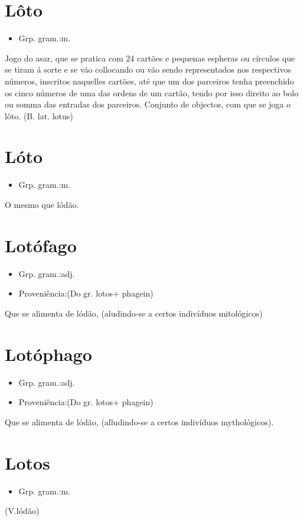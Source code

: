 \section{Lôto}
\begin{itemize}
\item {Grp. gram.:m.}
\end{itemize}
Jogo do asar, que se pratica com 24 cartões e pequenas espheras ou círculos que se tiram á sorte e se vão collocando ou vão sendo representados nos respectivos números, inscritos naquelles cartões, até que um dos parceiros tenha preenchido os cinco números de uma das ordens de um cartão, tendo por isso direito ao bolo ou somma das entradas dos parceiros.
Conjunto de objectos, com que se joga o lôto.
(B. lat. \textunderscore lotus\textunderscore )
\section{Lóto}
\begin{itemize}
\item {Grp. gram.:m.}
\end{itemize}
O mesmo que \textunderscore lódão\textunderscore .
\section{Lotófago}
\begin{itemize}
\item {Grp. gram.:adj.}
\end{itemize}
\begin{itemize}
\item {Proveniência:(Do gr. \textunderscore lotos\textunderscore  + \textunderscore phagein\textunderscore )}
\end{itemize}
Que se alimenta de lódão, (aludindo-se a certos indivíduos mitológicos)
\section{Lotóphago}
\begin{itemize}
\item {Grp. gram.:adj.}
\end{itemize}
\begin{itemize}
\item {Proveniência:(Do gr. \textunderscore lotos\textunderscore  + \textunderscore phagein\textunderscore )}
\end{itemize}
Que se alimenta de lódão, (alludindo-se a certos indivíduos mythológicos).
\section{Lotos}
\begin{itemize}
\item {Grp. gram.:m.}
\end{itemize}
(V.lódão)
